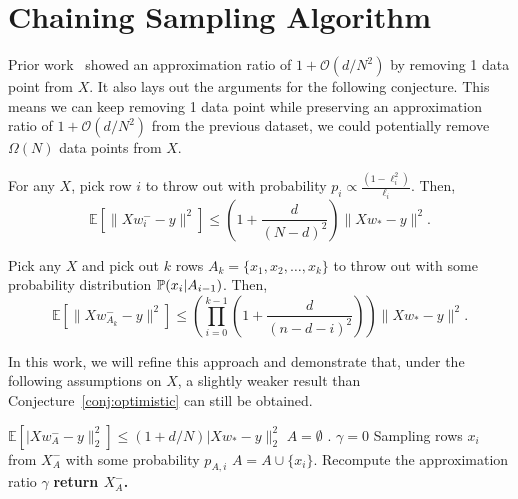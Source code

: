 \section{Chaining Sampling Algorithm}

Prior work~\cite{gittens2023} showed an approximation ratio of $1 + \mathcal{O}(d/N^2)$ by removing 1 data point from $X$. It also lays out the arguments for the following conjecture. This means we can keep removing 1 data point while preserving an approximation ratio of $1 + \mathcal{O}(d/N^2)$ from the previous dataset, we could potentially remove $\Omega(N)$ data points from $X$.

\begin{theorem} \label{cmi2023:theorem:2.2} \cite[Theorem 2.2]{gittens2023}
    For any $X$, pick row $i$ to throw out with probability $p_i \propto \frac{(1 - \ell_{i}^2)}{\ell_{i}}$. Then,
    \begin{equation}
        \mathbb{E}\left[ \lVert Xw_i^{-} - y \rVert^2 \right] \leq \left(1 + \frac{d}{(N - d)^2} \right)\lVert Xw_* - y \rVert^2.
    \end{equation}
\end{theorem}
\begin{conj} \label{conj:optimistic}
    Pick any $X$ and pick out $k$ rows $A_k = \{x_1, x_2, \dots, x_k\}$ to throw out with some probability distribution $\mathbb{P}(x_i | A_{i-1})$. Then,
    \begin{equation}
        \mathbb{E}\left[ \lVert Xw_{A_k}^- - y \rVert^2 \right] \leq \left(\prod_{i=0}^{k-1} \left( 1 + \frac{d}{(n - d - i)^2}\right) \right) \lVert Xw_* - y \rVert^2.
    \end{equation}
\end{conj}

In this work, we will refine this approach and demonstrate that, under the following assumptions on $X$, a slightly weaker result than Conjecture~\ref{conj:optimistic} can still be obtained.



\begin{algorithm}
\caption{Chaining Sampling Algorithm}\label{alg:outline-chaining}
\begin{algorithmic}[1]
\Ensure $\mathbb{E}[\lvert Xw_A^- - y \rVert^2_2] \leq (1 + d/N) \lvert Xw_* - y \rVert^2_2$
\State $A = \emptyset$ .
\State $\gamma = 0$ 
    \State Sampling rows $x_i$ from $X_A^{-}$ with some probability $p_{A, i}$  
    \State $A = A \cup \{x_i\}$.
    \State Recompute the approximation ratio $\gamma$
\EndWhile
\State \bf{return} $X_A^-$.
\end{algorithmic}
\end{algorithm}


